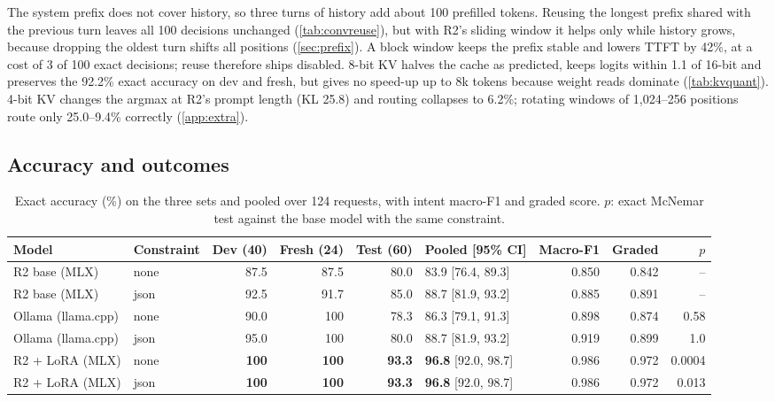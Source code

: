 \documentclass[journal]{IEEEtran}
\theoremstyle{definition}
\begin{document}
The system prefix does not cover history, so three turns of history add about 100 prefilled tokens.
Reusing the longest prefix shared with the previous turn leaves all 100 decisions unchanged
(\cref{tab:convreuse}), but with R2's sliding window it helps only while history grows, because
dropping the oldest turn shifts all positions (\cref{sec:prefix}). A block window keeps the prefix
stable and lowers TTFT by 42\%, at a cost of 3 of 100 exact decisions; reuse therefore ships
disabled. 8-bit KV halves the cache as predicted, keeps logits within 1.1 of 16-bit and preserves
the 92.2\% exact accuracy on dev and fresh, but gives no speed-up up to 8k tokens because weight
reads dominate (\cref{tab:kvquant}). 4-bit KV changes the argmax at R2's prompt length (KL 25.8) and routing collapses
to 6.2\%; rotating windows of 1{,}024--256 positions route only 25.0--9.4\% correctly
(\cref{app:extra}).

\subsection{Accuracy and outcomes}\label{sec:accuracy}

\begin{table}[t]
\centering\small
\caption{Exact accuracy (\%) on the three sets and pooled over 124 requests, with intent macro-F1
and graded score. $p$: exact McNemar test against the base model with the same constraint.}
\label{tab:accuracy}
\begin{tabular}{@{}llrrrlrrr@{}}
\toprule
Model & Constraint & Dev (40) & Fresh (24) & Test (60) & Pooled [95\% CI] & Macro-F1 & Graded & $p$ \\
\midrule
R2 base (MLX) & none & 87.5 & 87.5 & 80.0 & 83.9 [76.4, 89.3] & 0.850 & 0.842 & -- \\
R2 base (MLX) & json & 92.5 & 91.7 & 85.0 & 88.7 [81.9, 93.2] & 0.885 & 0.891 & -- \\
Ollama (llama.cpp) & none & 90.0 & 100 & 78.3 & 86.3 [79.1, 91.3] & 0.898 & 0.874 & 0.58 \\
Ollama (llama.cpp) & json & 95.0 & 100 & 80.0 & 88.7 [81.9, 93.2] & 0.919 & 0.899 & 1.0 \\
R2 + LoRA (MLX) & none & \textbf{100} & \textbf{100} & \textbf{93.3} & \textbf{96.8} [92.0, 98.7] & 0.986 & 0.972 & 0.0004 \\
R2 + LoRA (MLX) & json & \textbf{100} & \textbf{100} & \textbf{93.3} & \textbf{96.8} [92.0, 98.7] & 0.986 & 0.972 & 0.013 \\
\bottomrule
\end{tabular}
\end{table}
\end{document}
